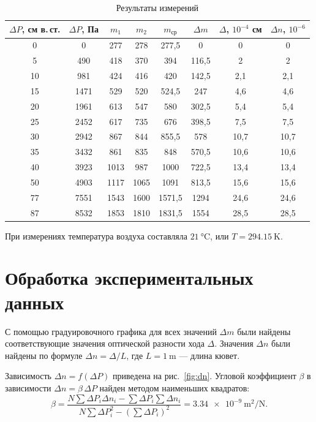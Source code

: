 \documentclass[14pt,a4paper]{extarticle}
\begin{document}
\begin{table}[htbp]
\caption{Результаты измерений}
\label{tab:rt}
\centering
\small
\setlength{\tabcolsep}{4pt}
\begin{tabular}{
S[table-format=2.0]
S[table-format=4.0]
S[table-format=4.0]
S[table-format=4.0]
S[table-format=4.1]
S[table-format=4.1]
S[table-format=2.1]
S[table-format=2.1]
}
\toprule
{$\Delta P$, см в.\,ст.} & {$\Delta P$, Па} & {$m_1$} & {$m_2$} & {$m_{\text{ср}}$} & {$\Delta m$} & {$\Delta$, $10^{-4}$ см} & {$\Delta n$, $10^{-6}$} \\
 & 0 & 277 & 278 & 277,5 & 0 & 0 & 0 \\
5 & 490 & 418 & 370 & 394 & 116,5 & 2 & 2 \\
10 & 981 & 424 & 416 & 420 & 142,5 & 2,1 & 2,1 \\
15 & 1471 & 529 & 520 & 524,5 & 247 & 4,6 & 4,6 \\
20 & 1961 & 613 & 547 & 580 & 302,5 & 5,4 & 5,4 \\
25 & 2452 & 617 & 735 & 676 & 398,5 & 7,5 & 7,5 \\
30 & 2942 & 867 & 844 & 855,5 & 578 & 10,7 & 10,7 \\
35 & 3432 & 861 & 835 & 848 & 570,5 & 10,6 & 10,6 \\
40 & 3923 & 1013 & 987 & 1000 & 722,5 & 13,4 & 13,4 \\
50 & 4903 & 1117 & 1065 & 1091 & 813,5 & 15,6 & 15,6 \\
77 & 7551 & 1543 & 1600 & 1571,5 & 1294 & 24,6 & 24,6 \\
87 & 8532 & 1853 & 1810 & 1831,5 & 1554 & 28,5 & 28,5 \\
\bottomrule
\end{tabular}
\end{table}

При измерениях температура воздуха составляла $\SI{21}{\celsius}$, или $T = \SI{294,15}{\kelvin}$.

\section*{Обработка экспериментальных данных}

С помощью градуировочного графика для всех значений $\Delta m$ были найдены соответствующие значения оптической разности хода $\Delta$.
Значения $\Delta n$ были найдены по формуле $\Delta n = \Delta / L$, где $L = \SI{1}{\metre}$ --- длина кювет.

Зависимость $\Delta n = f(\Delta P)$ приведена на рис.~\ref{fig:dn}. Угловой коэффициент $\beta$ в зависимости $\Delta n = \beta\,\Delta P$ найден методом наименьших квадратов:
\[
\beta = \frac{N\sum \Delta P_i \Delta n_i - \sum \Delta P_i \sum \Delta n_i}{N\sum \Delta P_i^2 - \left(\sum \Delta P_i\right)^2}
= \SI{3,34e-9}{\square\metre\per\newton}.
\]
\end{document}
